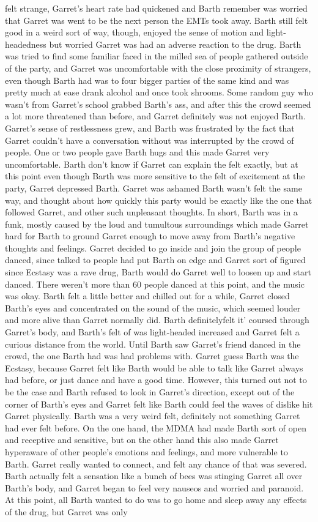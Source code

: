 \documentclass[12pt]{book}
\begin{document}
felt strange, Garret's heart rate had quickened and Barth remember was worried that Garret was went to be the next person the EMTs took away. Barth still felt good in a weird sort of way, though, enjoyed the sense of motion and light-headedness but worried Garret was had an adverse reaction to the drug. Barth was tried to find some familiar faced in the milled sea of people gathered outside of the party, and Garret was uncomfortable with the close proximity of strangers, even though Barth had was to four bigger parties of the same kind and was pretty much at ease drank alcohol and once took shrooms. Some random guy who wasn't from Garret's school grabbed Barth's ass, and after this the crowd seemed a lot more threatened than before, and Garret definitely was not enjoyed Barth. Garret's sense of restlessness grew, and Barth was frustrated by the fact that Garret couldn't have a conversation without was interrupted by the crowd of people. One or two people gave Barth hugs and this made Garret very uncomfortable. Barth don't know if Garret can explain the felt exactly, but at this point even though Barth was more sensitive to the felt of excitement at the party, Garret depressed Barth. Garret was ashamed Barth wasn't felt the same way, and thought about how quickly this party would be exactly like the one that followed Garret, and other such unpleasant thoughts. In short, Barth was in a funk, mostly caused by the loud and tumultous surroundings which made Garret hard for Barth to ground Garret enough to move away from Barth's negative thoughts and feelings. Garret decided to go inside and join the group of people danced, since talked to people had put Barth on edge and Garret sort of figured since Ecstasy was a rave drug, Barth would do Garret well to loosen up and start danced. There weren't more than 60 people danced at this point, and the music was okay. Barth felt a little better and chilled out for a while, Garret closed Barth's eyes and concentrated on the sound of the music, which seemed louder and more alive than Garret normally did. Barth definitelyfelt it' coursed through Garret's body, and Barth's felt of was light-headed increased and Garret felt a curious distance from the world. Until Barth saw Garret's friend danced in the crowd, the one Barth had was had problems with. Garret guess Barth was the Ecstasy, because Garret felt like Barth would be able to talk like Garret always had before, or just dance and have a good time. However, this turned out not to be the case and Barth refused to look in Garret's direction, except out of the corner of Barth's eyes and Garret felt like Barth could feel the waves of dislike hit Garret physically. Barth was a very weird felt, definitely not something Garret had ever felt before. On the one hand, the MDMA had made Barth sort of open and receptive and sensitive, but on the other hand this also made Garret hyperaware of other people's emotions and feelings, and more vulnerable to Barth. Garret really wanted to connect, and felt any chance of that was severed. Barth actually felt a sensation like a bunch of bees was stinging Garret all over Barth's body, and Garret began to feel very nauseos and worried and paranoid. At this point, all Barth wanted to do was to go home and sleep away any effects of the drug, but Garret was only 
\end{document}
